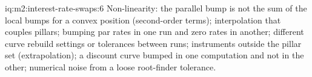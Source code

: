 \begin{solution}{iq:m2:interest-rate-swaps:6}
Non-linearity: the parallel bump is not the sum of the local bumps for a
convex position (second-order terms); interpolation that couples pillars;
bumping par rates in one run and zero rates in another; different curve
rebuild settings or tolerances between runs; instruments outside the pillar
set (extrapolation); a discount curve bumped in one computation and not in
the other; numerical noise from a loose root-finder tolerance.
\end{solution}
